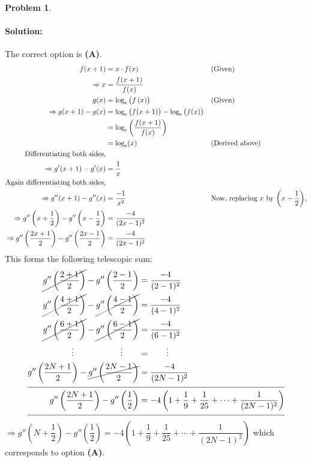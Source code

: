 \documentclass[14]{article}
\theoremstyle{definition}
\newtheorem{prob}{Problem}
\begin{document}
\begin{prob}
\paragraph{Solution:} The correct option is \textbf{(A)}.\\
\begin{align*}
f(x + 1) &= x \cdot f(x) && \text{(Given)}\\
\Rightarrow x &= \dfrac{f(x+1)}{f(x)}\\
g(x) &= \log_{\rm e}\left(f\left(x\right)\right) && \text{(Given)}\\
\Rightarrow g(x + 1) - g(x) &= \log_{\rm e}\left(f(x+1)\right) - \log_{\rm e}\left(f(x)\right)\\
&= \log_{\rm e}\left(\dfrac{f(x+1)}{f(x)}\right)\\
&= \log_{\rm e}(x) && \text{(Derived above)}\\
\text{Differentiating both sides,}\\
\Rightarrow g'(x+1) - g'(x) &= \dfrac1x\\
\text{Again differentiating both sides,}\\
\Rightarrow g''(x+1) - g''(x) &= \dfrac{-1}{x^2}&&
\text{Now, replacing $x$ by $\left(x - \dfrac12\right)$,}\\
\Rightarrow g''\left(x+ \dfrac12\right) -g''\left(x- \dfrac12\right) &= \dfrac{-4}{(2x-1)^2}\\
\Rightarrow g''\left(\dfrac{2x + 1}{2}\right) -g''\left(\dfrac{2x-1}{2}\right) &= \dfrac{-4}{(2x-1)^2}
\end{align*}
This forms the following telescopic sum:
\begin{align*}
\cancel{g''\left(\dfrac{2+1}{2}\right)} -
g''\left(\dfrac{2-1}{2}\right) 
&= \dfrac{-4}{(2-1)^2}\\
\cancel{g''\left(\dfrac{4+1}{2}\right)} -
\cancel{g''\left(\dfrac{4-1}{2}\right)}
&= \dfrac{-4}{(4-1)^2}\\
\cancel{g''\left(\dfrac{6+1}{2}\right)} -
\cancel{g''\left(\dfrac{6-1}{2}\right)}
&= \dfrac{-4}{(6-1)^2}\\
\vdots \;\;\;\;\;\;\;\;\;\;\;\;\;\;\;\;\;\;\;\;\vdots\;\;\;\;\;\;\; &= \;\;\;\;\;\;\; \vdots\\
g''\left(\dfrac{2N+1}{2}\right) -
\cancel{g''\left(\dfrac{2N-1}{2}\right)} 
&= \dfrac{-4}{(2N-1)^2}\\
\cline{1-2}
g''\left(\dfrac{2N+1}{2}\right) -
g''\left(\dfrac12\right) &= -4 \left(1 + \dfrac19 + \dfrac{1}{25} + \cdots + \dfrac{1}{(2N-1)^2} \right)\\
\cline{1-2}
\end{align*}
$\Rightarrow g''\left(N + \dfrac{1}{2}\right) - g''\left(\dfrac12\right) = -4 \left(1 + \dfrac19 + \dfrac{1}{25} + \cdots + \dfrac{1}{(2N-1)^2} \right)$ which corresponds to option \textbf{(A)}.
\end{prob}
\end{document}
